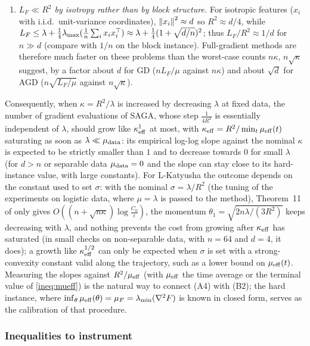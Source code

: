\begin{enumerate}[nosep,label=(\alph*)]
\item \emph{$L_F\ll R^2$ by isotropy rather than by block structure.} For isotropic features ($x_i$ with i.i.d.\ unit-variance coordinates), $\left\|x_i\right\|^2\approx d$ so $R^2\approx d/4$, while $L_F\le\lambda+\frac14\lambda_{\max}(\frac1n\sum_ix_ix_i^\top)\approx\lambda+\frac14(1+\sqrt{d/n})^2$; thus $L_F/R^2\approx1/d$ for $n\gg d$ (compare with $1/n$ on the block instance). Full-gradient methods are therefore much faster on these problems than the worst-case counts $n\kappa$, $n\sqrt\kappa$ suggest, by a factor about $d$ for GD ($nL_F/\mu$ against $n\kappa$) and about $\sqrt d$ for AGD ($n\sqrt{L_F/\mu}$ against $n\sqrt\kappa$).
\end{enumerate}
Consequently, when $\kappa=R^2/\lambda$ is increased by decreasing $\lambda$ at fixed data, the number of gradient evaluations of SAGA, whose step $\frac1{4R^2}$ is essentially independent of $\lambda$, should grow like $\kappa_{\rm eff}^{1}$ at most, with $\kappa_{\rm eff}=R^2/\min_t\mu_{\mathrm{eff}}(t)$ saturating as soon as $\lambda\ll\mu_{\rm data}$: its empirical log-log slope against the nominal $\kappa$ is expected to be strictly smaller than $1$ and to decrease towards $0$ for small $\lambda$ (for $d>n$ or separable data $\mu_{\rm data}=0$ and the slope can stay close to its hard-instance value, with large constants). For L-Katyusha the outcome depends on the constant used to set $\sigma$: with the nominal $\sigma=\lambda/R^2$ (the tuning of the experiments on logistic data, where $\mu=\lambda$ is passed to the method), Theorem~11 of \cite{kovalev2020dont} only gives $O((n+\sqrt{n\kappa})\log\frac{C_0}\varepsilon)$, the momentum $\theta_1=\sqrt{2n\lambda/(3R^2)}$ keeps decreasing with $\lambda$, and nothing prevents the cost from growing after $\kappa_{\rm eff}$ has saturated (in small checks on non-separable data, with $n=64$ and $d=4$, it does); a growth like $\kappa_{\rm eff}^{1/2}$ can only be expected when $\sigma$ is set with a strong-convexity constant valid along the trajectory, such as a lower bound on $\mu_{\mathrm{eff}}(t)$. Measuring the slopes against $R^2/\mu_{\mathrm{eff}}$ (with $\mu_{\mathrm{eff}}$ the time average or the terminal value of \eqref{ineq:mueff}) is the natural way to connect (A4) with (B2); the hard instance, where $\inf_\theta\mu_{\mathrm{eff}}(\theta)=\mu_F=\lambda_{\min}(\nabla^2F)$ is known in closed form, serves as the calibration of that procedure.

\subsubsection{Inequalities to instrument}
\label{sec:lb:instrument}

